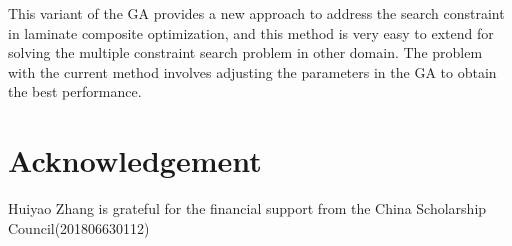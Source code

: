 \documentclass[USenglish,twocolumn]{article}
\begin{document}
This variant of the GA provides a new approach to address the search constraint in laminate composite
optimization, and this method is very easy to extend for solving the multiple constraint search problem in other
domain. The problem with the current method involves adjusting the parameters in the GA to obtain the best
performance.

\section{Acknowledgement}
Huiyao Zhang is grateful for the financial support from the China Scholarship Council(201806630112)



\end{document}
